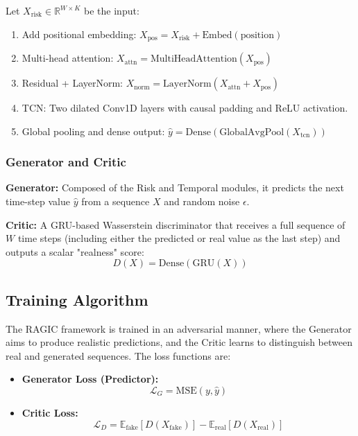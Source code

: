 Let $X_{\text{risk}} \in \mathbb{R}^{W \times K}$ be the input:
\begin{enumerate}
    \item Add positional embedding: $X_{\text{pos}} = X_{\text{risk}} + \text{Embed}(\text{position})$
    \item Multi-head attention: $X_{\text{attn}} = \text{MultiHeadAttention}(X_{\text{pos}})$
    \item Residual + LayerNorm: $X_{\text{norm}} = \text{LayerNorm}(X_{\text{attn}} + X_{\text{pos}})$
    \item TCN: Two dilated Conv1D layers with causal padding and ReLU activation.
    \item Global pooling and dense output: $\hat{y} = \text{Dense}( \text{GlobalAvgPool}(X_{\text{tcn}}) )$
\end{enumerate}

\subsubsection{Generator and Critic}

\textbf{Generator:} Composed of the Risk and Temporal modules, it predicts the next time-step value $\hat{y}$ from a sequence $X$ and random noise $\epsilon$.

\textbf{Critic:} A GRU-based Wasserstein discriminator that receives a full sequence of $W$ time steps (including either the predicted or real value as the last step) and outputs a scalar "realness" score:
\[
D(X) = \text{Dense}(\text{GRU}(X))
\]

\subsection{Training Algorithm}

The RAGIC framework is trained in an adversarial manner, where the Generator aims to produce realistic predictions, and the Critic learns to distinguish between real and generated sequences. The loss functions are:

\begin{itemize}
    \item \textbf{Generator Loss (Predictor):}
    \[
    \mathcal{L}_G = \text{MSE}(y, \hat{y})
    \]
    
    \item \textbf{Critic Loss:}
    \[
    \mathcal{L}_D = \mathbb{E}_{\text{fake}}[D(X_{\text{fake}})] - \mathbb{E}_{\text{real}}[D(X_{\text{real}})]
    \]
\end{itemize}

